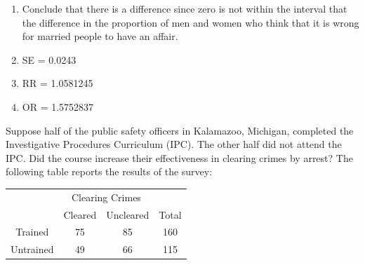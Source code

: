 \documentclass[11pt, chapterprefix=true]{scrbook}\usepackage[]{graphicx}\usepackage[]{color}
\begin{document}
\begin{exercises}
\begin{exercise}
\begin{enumerate}

\end{enumerate}

	\end{exercise}
	\begin{solution}



	  \begin{enumerate}
	  \item Conclude that there is a difference since zero is not within the interval that the difference in the proportion of men and women who think that it is wrong for married people to have an affair.
	  \item SE = 0.0243
	  \item RR = 1.0581245
	  \item OR = 1.5752837
	  \end{enumerate}

	\end{solution}

  \begin{exercise} %

      Suppose half of the public safety officers in Kalamazoo, Michigan, completed the Investigative Procedures Curriculum (IPC).  The other half did not attend the IPC.  Did the course increase their effectiveness in clearing crimes by arrest?  The following table reports the results of the survey:

\vspace{2mm}


\begin{table}[ht]
\centering
\begin{tabular}{@{} cccc @{}} \hline
 & \multicolumn{2}{c}{Clearing Crimes} \\
 & Cleared & Uncleared & Total \\ \hline
Trained & 75 & 85 & 160 \\
Untrained & 49 & 66 & 115 \\ \hline
\end{tabular}
\end{table}



\end{exercise}
\end{exercises}
\end{document}
